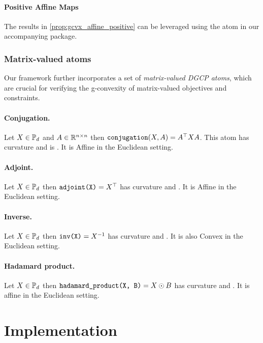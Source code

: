 \documentclass[twoside,11pt]{article}
\begin{document}
\paragraph{Positive Affine Maps}

The results in \ref{prop:gcvx_affine_positive} can be leveraged using the  atom in our accompanying package.

\subsubsection{Matrix-valued atoms}
Our framework further incorporates a set of \emph{matrix-valued DGCP atoms}, which are crucial for verifying the g-convexity of matrix-valued objectives and constraints.

\paragraph{Conjugation.} Let $X \in \mathbb{P}_d$ and $A \in \mathbb{R}^{n \times n}$ then $\texttt{conjugation}(X, A) = A^\top X A$.
This atom has  curvature and is . It is Affine in the Euclidean setting.

\paragraph{Adjoint.} Let $X \in \mathbb{P}_d$ then $\texttt{adjoint(X)} = X^\top$ has  curvature and . It is Affine in the Euclidean setting.

\paragraph{Inverse.} Let $X \in \mathbb{P}_d$ then $\texttt{inv(X)} = X^{-1}$ has  curvature and . It is also Convex in the Euclidean setting.

\paragraph{Hadamard product.} Let $X \in \mathbb{P}_d$ then $\texttt{hadamard\_product(X, B)} = X \odot B$ has  curvature and . It is affine in the Euclidean setting.








\section{Implementation}
\end{document}
